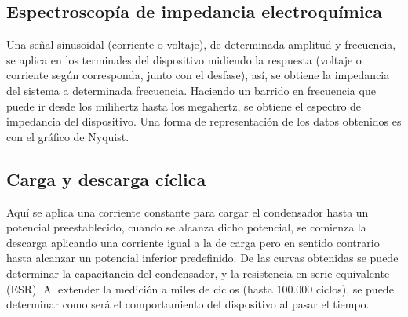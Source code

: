 \subsection{Espectroscopía de impedancia electroquímica}
Una señal sinusoidal (corriente o voltaje), de determinada amplitud y frecuencia, se aplica en los terminales del dispositivo midiendo la respuesta (voltaje o corriente según corresponda, junto con el desfase), así, se obtiene la impedancia del sistema a determinada frecuencia. Haciendo un barrido en frecuencia que puede ir desde los milihertz hasta los megahertz, se obtiene el espectro de impedancia del dispositivo. Una forma de representación de los datos obtenidos es con el gráfico de Nyquist. 

\subsection{Carga y descarga cíclica}
Aquí se aplica una corriente constante para cargar el condensador hasta un potencial preestablecido, cuando se alcanza dicho potencial, se comienza la descarga aplicando una corriente igual a la de carga pero en sentido contrario hasta alcanzar un potencial inferior predefinido. De las curvas obtenidas se puede determinar la capacitancia del condensador, y la resistencia en serie equivalente (ESR). Al extender la medición a miles de ciclos (hasta 100.000 ciclos), se puede determinar como será el comportamiento del dispositivo al pasar el tiempo.